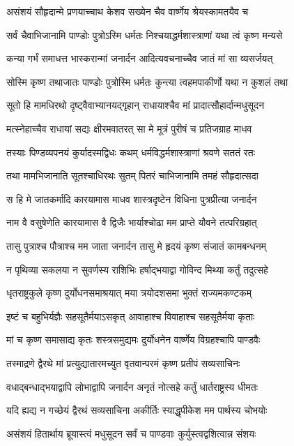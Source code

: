 \twolineshloka
{असंशयं सौहृदान्मे प्रणयाच्चाथ केशव}
{सख्येन चैव वार्ष्णेय श्रेयस्कामतयैव च}


\twolineshloka
{सर्वं चैवाभिजानामि पाण्डोः पुत्रोऽस्मि धर्मतः}
{निश्चयाद्धर्मशास्त्राणां यथा त्वं कृष्ण मन्यसे}


\twolineshloka
{कन्या गर्भं समाधत्त भास्करान्मां जनार्दन}
{आदित्यवचनाच्चैव जातं मां सा व्यसर्जयत्}


\twolineshloka
{सोस्मि कृष्ण तथाजातः पाण्डोः पुत्रोस्मि धर्मतः}
{कुन्त्या त्वहमपाकीर्णो यथा न कुशलं तथा}


\twolineshloka
{सूतो हि मामधिरथो दृष्ट्वैवाभ्यानयद्गृहान्}
{राधायाश्चैव मां प्रादात्सौहार्दान्मधुसूदन}


\twolineshloka
{मत्स्नेहाच्चैव राधायां सद्यः क्षीरमवातरत्}
{सा मे मूत्रं पुरीषं च प्रतिजग्राह माधव}


\twolineshloka
{तस्याः पिण्डव्यपनयं कुर्यादस्मद्विधः कथम्}
{धर्मविद्धर्मशास्त्राणां श्रवणे सततं रतः}


\twolineshloka
{तथा मामभिजानाति सूतश्चाधिरथः सुतम्}
{पितरं चाभिजानामि तमहं सौहृदात्सदा}


\twolineshloka
{स हि मे जातकर्मादि कारयामास माधव}
{शास्त्रदृष्टेन विधिना पुत्रप्रीत्या जनार्दन}


\twolineshloka
{नाम वै वसुषेणेति कारयामास वै द्विजैः}
{भार्याश्चोढा मम प्राप्ते यौवने तत्परिग्रहात्}


\twolineshloka
{तासु पुत्राश्च पौत्राश्च मम जाता जनार्दन}
{तासु मे हृदयं कृष्ण संजातं कामबन्धनम्}


\twolineshloka
{न पृथिव्या सकलया न सुवर्णस्य राशिभिः}
{हर्षाद्भयाद्वा गोविन्द मिथ्या कर्तुं तदुत्सहे}


\twolineshloka
{धृतराष्ट्रकुले कृष्ण दुर्योधनसमाश्रयात्}
{मया त्रयोदशसमा भुक्तं राज्यमकण्टकम्}


\twolineshloka
{इष्टं च बहुभिर्यज्ञैः सहसूतैर्मयाऽसकृत्}
{आवाहाश्च विवाहाश्च सहसूतैर्मया कृताः}


\twolineshloka
{मां च कृष्ण समासाद्य कृतः शस्त्रसमुद्यमः}
{दुर्योधनेन वार्ष्णेय विग्रहश्चापि पाण्डवैः}


\twolineshloka
{तस्माद्रणे द्वैरथे मां प्रत्युद्यातारमच्युत}
{वृतवान्परमं कृष्ण प्रतीपं सव्यसाचिनः}


\twolineshloka
{वधाद्बन्धाद्भयाद्वापि लोभाद्वापि जनार्दन}
{अनृतं नोत्सहे कर्तुं धार्तराष्ट्रस्य धीमतः}


\twolineshloka
{यदि ह्यद्य न गच्छेयं द्वैरथं सव्यसाचिना}
{अकीर्तिः स्याद्धृपीकेश मम पार्थस्य चोभयोः}


\twolineshloka
{असंशयं हितार्थाय ब्रूयास्त्वं मधुसूदन}
{सर्वं च पाण्डवाः कुर्युस्त्वद्वशित्वान्न संशयः}


